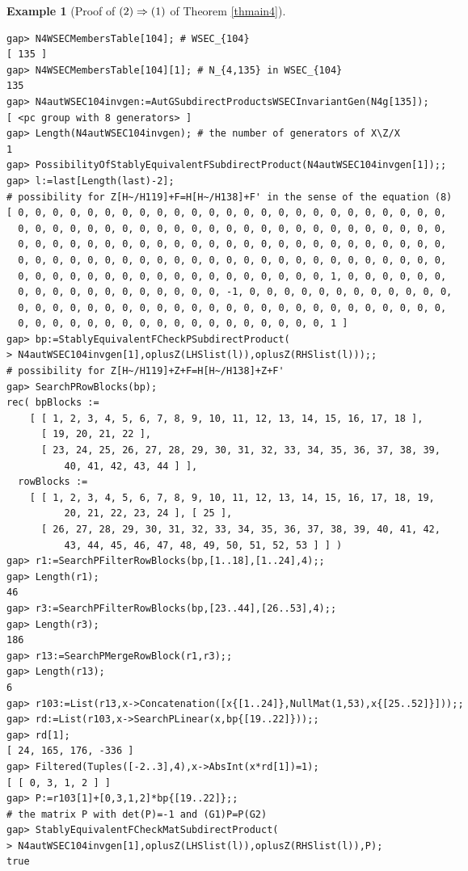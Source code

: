 \documentclass{amsart}
\theoremstyle{plain}
\theoremstyle{definition}
\newtheorem{example}[theorem]{Example}
\theoremstyle{remark}
\begin{document}
\begin{example}[Proof of ${\rm (2)}\Rightarrow {\rm (1)}$ of {Theorem \ref{thmain4}}]
\begin{verbatim}
gap> N4WSECMembersTable[104]; # WSEC_{104}
[ 135 ]
gap> N4WSECMembersTable[104][1]; # N_{4,135} in WSEC_{104}
135
gap> N4autWSEC104invgen:=AutGSubdirectProductsWSECInvariantGen(N4g[135]);
[ <pc group with 8 generators> ]
gap> Length(N4autWSEC104invgen); # the number of generators of X\Z/X
1
gap> PossibilityOfStablyEquivalentFSubdirectProduct(N4autWSEC104invgen[1]);;
gap> l:=last[Length(last)-2];
# possibility for Z[H~/H119]+F=H[H~/H138]+F' in the sense of the equation (8)
[ 0, 0, 0, 0, 0, 0, 0, 0, 0, 0, 0, 0, 0, 0, 0, 0, 0, 0, 0, 0, 0, 0, 0, 0, 0, 
  0, 0, 0, 0, 0, 0, 0, 0, 0, 0, 0, 0, 0, 0, 0, 0, 0, 0, 0, 0, 0, 0, 0, 0, 0, 
  0, 0, 0, 0, 0, 0, 0, 0, 0, 0, 0, 0, 0, 0, 0, 0, 0, 0, 0, 0, 0, 0, 0, 0, 0, 
  0, 0, 0, 0, 0, 0, 0, 0, 0, 0, 0, 0, 0, 0, 0, 0, 0, 0, 0, 0, 0, 0, 0, 0, 0, 
  0, 0, 0, 0, 0, 0, 0, 0, 0, 0, 0, 0, 0, 0, 0, 0, 0, 0, 1, 0, 0, 0, 0, 0, 0, 
  0, 0, 0, 0, 0, 0, 0, 0, 0, 0, 0, 0, -1, 0, 0, 0, 0, 0, 0, 0, 0, 0, 0, 0, 0, 
  0, 0, 0, 0, 0, 0, 0, 0, 0, 0, 0, 0, 0, 0, 0, 0, 0, 0, 0, 0, 0, 0, 0, 0, 0, 
  0, 0, 0, 0, 0, 0, 0, 0, 0, 0, 0, 0, 0, 0, 0, 0, 0, 0, 1 ]
gap> bp:=StablyEquivalentFCheckPSubdirectProduct(
> N4autWSEC104invgen[1],oplusZ(LHSlist(l)),oplusZ(RHSlist(l)));;
# possibility for Z[H~/H119]+Z+F=H[H~/H138]+Z+F'
gap> SearchPRowBlocks(bp);
rec( bpBlocks := 
    [ [ 1, 2, 3, 4, 5, 6, 7, 8, 9, 10, 11, 12, 13, 14, 15, 16, 17, 18 ], 
      [ 19, 20, 21, 22 ], 
      [ 23, 24, 25, 26, 27, 28, 29, 30, 31, 32, 33, 34, 35, 36, 37, 38, 39, 
          40, 41, 42, 43, 44 ] ], 
  rowBlocks := 
    [ [ 1, 2, 3, 4, 5, 6, 7, 8, 9, 10, 11, 12, 13, 14, 15, 16, 17, 18, 19, 
          20, 21, 22, 23, 24 ], [ 25 ], 
      [ 26, 27, 28, 29, 30, 31, 32, 33, 34, 35, 36, 37, 38, 39, 40, 41, 42, 
          43, 44, 45, 46, 47, 48, 49, 50, 51, 52, 53 ] ] )
gap> r1:=SearchPFilterRowBlocks(bp,[1..18],[1..24],4);;
gap> Length(r1);
46
gap> r3:=SearchPFilterRowBlocks(bp,[23..44],[26..53],4);;
gap> Length(r3);
186
gap> r13:=SearchPMergeRowBlock(r1,r3);;
gap> Length(r13);
6
gap> r103:=List(r13,x->Concatenation([x{[1..24]},NullMat(1,53),x{[25..52]}]));;
gap> rd:=List(r103,x->SearchPLinear(x,bp{[19..22]}));;
gap> rd[1];
[ 24, 165, 176, -336 ]
gap> Filtered(Tuples([-2..3],4),x->AbsInt(x*rd[1])=1);
[ [ 0, 3, 1, 2 ] ]
gap> P:=r103[1]+[0,3,1,2]*bp{[19..22]};;
# the matrix P with det(P)=-1 and (G1)P=P(G2)
gap> StablyEquivalentFCheckMatSubdirectProduct(
> N4autWSEC104invgen[1],oplusZ(LHSlist(l)),oplusZ(RHSlist(l)),P);
true


\end{verbatim}
\end{example}
\end{document}
